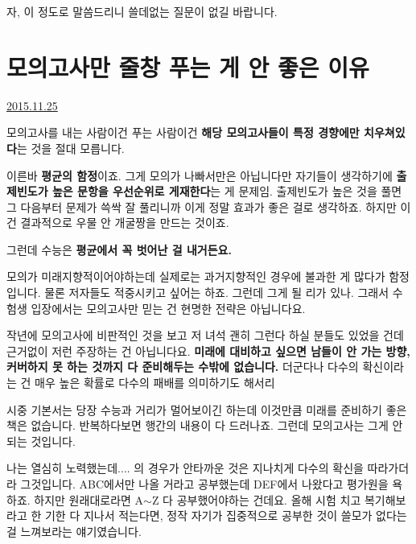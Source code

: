 자, 이 정도로 말씀드리니 쓸데없는 질문이 없길 바랍니다.
\vspace{5mm}







\section{모의고사만 줄창 푸는 게 안 좋은 이유}
\href{https://www.kockoc.com/Apoc/509601}{2015.11.25}

\vspace{5mm}

모의고사를 내는 사람이건 푸는 사람이건
\textbf{해당 모의고사들이 특정 경향에만 치우쳐있다}는 것을 절대 모릅니다.
\vspace{5mm}

이른바 \textbf{평균의 함정}이죠. 그게 모의가 나빠서만은 아닙니다만
자기들이 생각하기에 \textbf{출제빈도가 높은 문항을 우선순위로 게재한다}는 게 문제임.
출제빈도가 높은 것을 풀면 그 다음부터 문제가 쓱싹 잘 풀리니까 이게 정말 효과가 좋은 걸로 생각하죠.
하지만 이건 결과적으로 우물 안 개굴짱을 만드는 것이죠.
\vspace{5mm}

그런데 수능은 \textbf{평균에서 꼭 벗어난 걸 내거든요.}
\vspace{5mm}

모의가 미래지향적이어야하는데 실제로는 과거지향적인 경우에 불과한 게 많다가 함정입니다.
물론 저자들도 적중시키고 싶어는 하죠. 그런데 그게 될 리가 있나.
그래서 수험생 입장에서는 모의고사만 믿는 건 현명한 전략은 아닙니다요.
\vspace{5mm}

작년에 모의고사에 비판적인 것을 보고 저 녀석 괜히 그런다 하실 분들도 있었을 건데
근거없이 저런 주장하는 건 아닙니다요.
\textbf{미래에 대비하고 싶으면 남들이 안 가는 방향, 커버하지 못 하는 것까지 다 준비해두는 수밖에 없습니다.}
더군다나 다수의 확신이라는 건 매우 높은 확률로 다수의 패배를 의미하기도 해서리
\vspace{5mm}

시중 기본서는 당장 수능과 거리가 멀어보이긴 하는데 이것만큼 미래를 준비하기 좋은 책은 없습니다.
반복하다보면 행간의 내용이 다 드러나죠. 그런데 모의고사는 그게 안 되는 것입니다.
\vspace{5mm}

나는 열심히 노력했는데.... 의 경우가 안타까운 것은 지나치게 다수의 확신을 따라가더라 그것입니다.
ABC에서만 나올 거라고 공부했는데 DEF에서 나왔다고 평가원을 욕하죠. 하지만 원래대로라면 A$\sim$Z 다 공부했어야하는 건데요.
올해 시험 치고 복기해보라고 한 기한 다 지나서 적는다면, 정작 자기가 집중적으로 공부한 것이 쓸모가 없다는 걸 느껴보라는 얘기였습니다.
\vspace{5mm}

